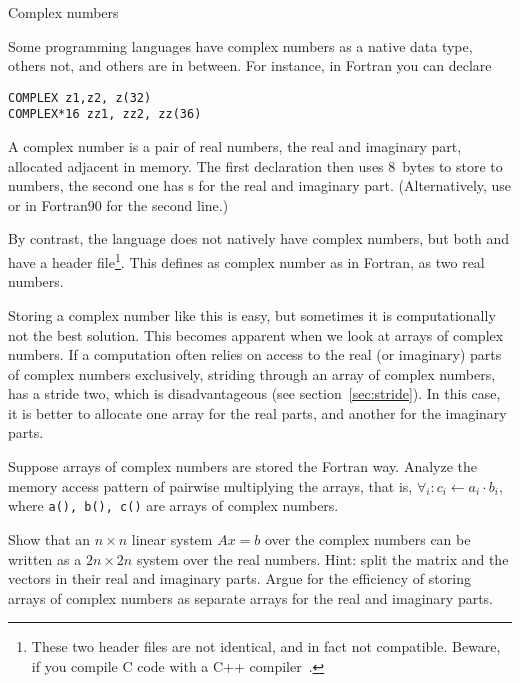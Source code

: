  {Complex numbers}
\label{sec:complex}

Some programming languages have complex numbers as a native data type,
others not, and others are in between. For instance, in Fortran you
can declare
\begin{verbatim}
COMPLEX z1,z2, z(32)
COMPLEX*16 zz1, zz2, zz(36)
\end{verbatim}
A complex number is a pair of real numbers, the real and imaginary
part, allocated adjacent in memory. The first declaration then uses
8~bytes to store to  numbers, the second one has s
for the real and imaginary part.  (Alternatively, use  or in Fortran90  for the second line.)

By contrast, the  language does not natively have complex
numbers, but both  and  have a  header
file\footnote {These two header files are not identical, and in fact
  not compatible. Beware, if you compile C code with a C++
  compiler~\cite{DobbsComplex}.}. This defines as complex number as in
Fortran, as two real numbers.

Storing a complex number like this is easy, but sometimes it is
computationally not the best solution. This becomes apparent when we
look at arrays of complex numbers.
If a computation often relies
on access to the real (or imaginary) parts of complex numbers
exclusively, striding through an array of complex numbers, has a
stride two, which is disadvantageous (see
section~\ref{sec:stride}). In this case, it is better to allocate one
array for the real parts, and another for the imaginary parts.

\begin{exercise}
  Suppose arrays of complex numbers are stored the Fortran
  way. Analyze the memory access pattern of pairwise multiplying the
  arrays, that is, $\forall_i\colon c_i\leftarrow a_i\cdot b_i$, where
  \texttt{a(), b(), c()} are arrays of complex numbers.
\end{exercise}

\begin{exercise}
  Show that an $n\times n$ linear system $Ax=b$ over the complex numbers
  can be written as a $2n\times 2n$ system over the real
  numbers. Hint: split the matrix and the vectors in their real and
  imaginary parts. Argue for the efficiency of storing arrays of
  complex numbers as separate arrays for the real and imaginary parts.
\end{exercise}

